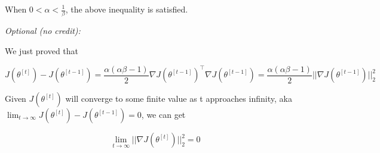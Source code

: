 \begin{answer}
When $0 < \alpha < \frac{1}{\beta}$, the above inequality is satisfied.


\textit{Optional (no credit):}

We just proved that 

\begin{equation*}
J(\theta^{[t]}) - J(\theta^{[t - 1]}) = \frac{\alpha(\alpha \beta - 1)}{2} \nabla J(\theta^{[t-1]})^\top \nabla J(\theta^{[t-1]}) = \frac{\alpha(\alpha \beta - 1)}{2} ||\nabla J(\theta^{[t - 1]})||_{2}^{2}
\end{equation*}

Given $J(\theta^{[t]})$ will converge to some finite value as t approaches infinity,  aka $\lim_{t\to\infty} J(\theta^{[t]}) - J(\theta^{[t - 1]}) = 0$, we can get 

\begin{equation*}
\lim_{t\to\infty}||\nabla J(\theta^{[t]})||_{2}^{2}=0
\end{equation*}

\end{answer}
